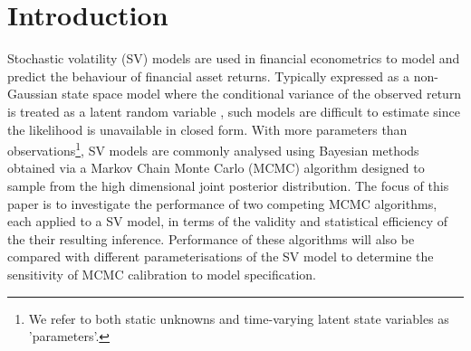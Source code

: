 \documentclass[12pt, a4paper]{article}
\begin{document}
\begin{abstract}
\end{abstract}

\newpage

\tableofcontents{\protect\newpage}

\section{Introduction}
    Stochastic volatility (SV) models are used in financial econometrics to model and predict the behaviour of financial asset returns. Typically expressed as a non-Gaussian state space model where the conditional variance of the observed return is treated as a latent random variable \citep{hull1987pricing, chesney1989pricing}, such models are difficult to estimate since the likelihood is unavailable in closed form. With more parameters than observations\footnote{We refer to both static unknowns and time-varying latent state variables as 'parameters'.}, SV models are commonly analysed using Bayesian methods obtained via a Markov Chain Monte Carlo (MCMC) algorithm designed to sample from the high dimensional joint posterior distribution. The focus of this paper is to investigate the performance of two competing MCMC algorithms, each applied to a SV model, in terms of the validity and statistical efficiency of the their resulting inference. Performance of these algorithms will also be compared with different parameterisations of the SV model to determine the sensitivity of MCMC calibration to model specification.
\end{document}
